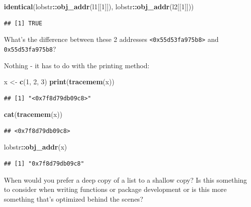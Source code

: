 \documentclass[]{book}
\newenvironment{Shaded}{\begin{snugshade}}{\end{snugshade}}
\newcommand{\DecValTok}[1]{\textcolor[rgb]{0.00,0.00,0.81}{#1}}
\newcommand{\KeywordTok}[1]{\textcolor[rgb]{0.13,0.29,0.53}{\textbf{#1}}}
\newcommand{\NormalTok}[1]{#1}
\newcommand{\OperatorTok}[1]{\textcolor[rgb]{0.81,0.36,0.00}{\textbf{#1}}}
\newcommand{\StringTok}[1]{\textcolor[rgb]{0.31,0.60,0.02}{#1}}
\begin{document}
\begin{Shaded}
\begin{Highlighting}[]
\KeywordTok{identical}\NormalTok{(lobstr}\OperatorTok{::}\KeywordTok{obj_addr}\NormalTok{(l1[[}\DecValTok{1}\NormalTok{]]), lobstr}\OperatorTok{::}\KeywordTok{obj_addr}\NormalTok{(l2[[}\DecValTok{1}\NormalTok{]]))}
\end{Highlighting}
\end{Shaded}

\begin{verbatim}
## [1] TRUE
\end{verbatim}

What's the difference between these 2 addresses \texttt{\textless{}0x55d53fa975b8\textgreater{}} and \texttt{0x55d53fa975b8}?

Nothing - it has to do with the printing method:

\begin{Shaded}
\begin{Highlighting}[]
\NormalTok{x <-}\StringTok{ }\KeywordTok{c}\NormalTok{(}\DecValTok{1}\NormalTok{, }\DecValTok{2}\NormalTok{, }\DecValTok{3}\NormalTok{)}
\KeywordTok{print}\NormalTok{(}\KeywordTok{tracemem}\NormalTok{(x))}
\end{Highlighting}
\end{Shaded}

\begin{verbatim}
## [1] "<0x7f8d79db09c8>"
\end{verbatim}

\begin{Shaded}
\begin{Highlighting}[]
\KeywordTok{cat}\NormalTok{(}\KeywordTok{tracemem}\NormalTok{(x))}
\end{Highlighting}
\end{Shaded}

\begin{verbatim}
## <0x7f8d79db09c8>
\end{verbatim}

\begin{Shaded}
\begin{Highlighting}[]
\NormalTok{lobstr}\OperatorTok{::}\KeywordTok{obj_addr}\NormalTok{(x)}
\end{Highlighting}
\end{Shaded}

\begin{verbatim}
## [1] "0x7f8d79db09c8"
\end{verbatim}

When would you prefer a deep copy of a list to a shallow copy? Is this something to consider when writing functions or package development or is this more something that's optimized behind the scenes?
\end{document}
